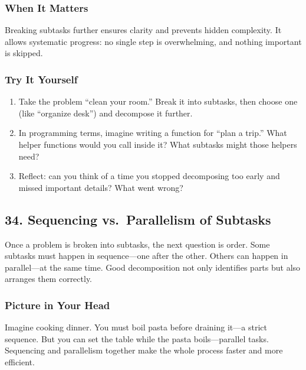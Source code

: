 \documentclass[
  letterpaper,
  DIV=11,
  numbers=noendperiod]{scrreprt}
\providecommand{\tightlist}{%
  \setlength{\itemsep}{0pt}\setlength{\parskip}{0pt}}
\begin{document}
\subsubsection{When It Matters}\label{when-it-matters-30}

Breaking subtasks further ensures clarity and prevents hidden
complexity. It allows systematic progress: no single step is
overwhelming, and nothing important is skipped.

\subsubsection{Try It Yourself}\label{try-it-yourself-32}

\begin{enumerate}
\def\labelenumi{\arabic{enumi}.}
\tightlist
\item
  Take the problem ``clean your room.'' Break it into subtasks, then
  choose one (like ``organize desk'') and decompose it further.
\item
  In programming terms, imagine writing a function for ``plan a trip.''
  What helper functions would you call inside it? What subtasks might
  those helpers need?
\item
  Reflect: can you think of a time you stopped decomposing too early and
  missed important details? What went wrong?
\end{enumerate}

\subsection{34. Sequencing vs.~Parallelism of
Subtasks}\label{sequencing-vs.-parallelism-of-subtasks}

Once a problem is broken into subtasks, the next question is order. Some
subtasks must happen in sequence---one after the other. Others can
happen in parallel---at the same time. Good decomposition not only
identifies parts but also arranges them correctly.

\subsubsection{Picture in Your Head}\label{picture-in-your-head-33}

Imagine cooking dinner. You must boil pasta before draining it---a
strict sequence. But you can set the table while the pasta
boils---parallel tasks. Sequencing and parallelism together make the
whole process faster and more efficient.
\end{document}
